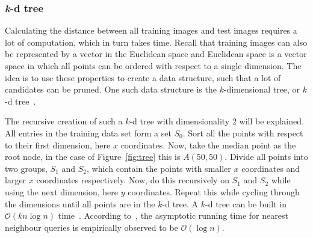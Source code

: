 \subsubsection{\textit{k}-d tree}
Calculating the distance between all training images and test images requires a lot of computation, which in turn takes time.
Recall that training images can also be represented by a vector in the Euclidean space and Euclidean space is a vector space in which all points can be ordered with respect to a single dimension.
The idea is to use these properties to create a data structure, such that a lot of candidates can be pruned.
One such data structure is the \(k\)-dimensional tree, or \(k\)-d tree~\cite{Bentley2002}.

The recursive creation of such a \(k\)-d tree with dimensionality \(2\) will be explained.
All entries in the training data set form a set \(S_0\). Sort all the points with respect to their first dimension, here \(x\) coordinates. Now, take the median point as the root node, in the case of Figure~\ref{fig:tree} this is \(A(50, 50)\). Divide all points into two groups, \(S_1\) and \(S_2\), which contain the points with smaller \(x\) coordinates and larger \(x\) coordinates respectively. Now, do this recursively on \(S_1\) and \(S_2\) while using the next dimension, here \(y\) coordinates. Repeat this while cycling through the dimensions until all points are in the \(k\)-d tree.
A \(k\)-d tree can be built in \(\mathcal{O}(kn \log n)\) time~\cite{Brown2015kdtree}.
According to~\cite{Bentley2002}, the asymptotic running time for nearest neighbour queries is empirically observed to be \(\mathcal{O}(\log n)\).

